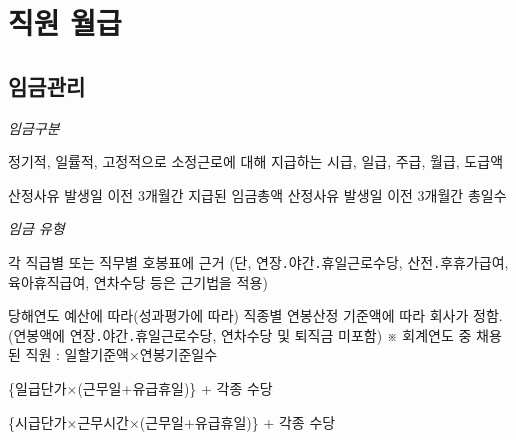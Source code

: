 ﻿\section{직원 월급}
\subsection{임금관리}
\emph{임금구분}
\begin{description}\tightlist
\item[통상임금] 정기적, 일률적, 고정적으로 소정근로에 대해 지급하는 
   시급, 일급, 주급, 월급, 도급액
\item[평균임금] 산정사유 발생일 이전 3개월간 지급된 임금총액
     산정사유 발생일 이전 3개월간 총일수
\end{description}
\emph{임금 유형}
\begin{description}\tightlist
\item[호봉제] 각 직급별 또는 직무별 호봉표에 근거
   (단, 연장․야간․휴일근로수당, 산전․후휴가급여, 육아휴직급여,
    연차수당 등은 근기법을 적용)  

\item[연봉제] 당해연도 예산에 따라(성과평가에 따라) 직종별 연봉산정 기준액에 따라
   회사가 정함.
   (연봉액에 연장․야간․휴일근로수당, 연차수당 및 퇴직금 미포함)
   ※ 회계연도 중 채용된 직원 : 일할기준액×연봉기준일수

\item[일급제] \{일급단가×(근무일+유급휴일)\} + 각종 수당

\item[시급제] \{시급단가×근무시간×(근무일+유급휴일)\} + 각종 수당

\end{description}
